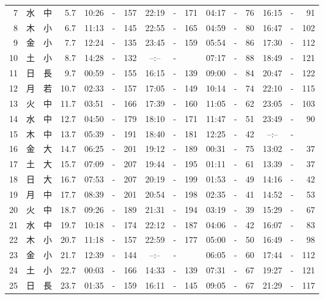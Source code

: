 \documentclass[12pt.a4j]{jsarticle}
\begin{document}
\begin{center}
\begin{table}[ht]
\begin{tabular}{|rc|cr|ccrccr|ccrccr|}
 7 & 水 & 中 &  5.7 &  10:26 &-& 157  &  22:19 &-& 171  &   04:17 &-&  76  &   16:15 &-&  91  \\
 8 & 木 & 小 &  6.7 &  11:13 &-& 145  &  22:55 &-& 165  &   04:59 &-&  80  &   16:47 &-& 102  \\
 9 & 金 & 小 &  7.7 &  12:24 &-& 135  &  23:45 &-& 159  &   05:54 &-&  86  &   17:30 &-& 112  \\
10 & 土 & 小 &  8.7 &  14:28 &-& 132  &  --:-- &-&     &   07:17 &-&  88  &   18:49 &-& 121  \\
11 & 日 & 長 &  9.7 &  00:59 &-& 155  &  16:15 &-& 139  &   09:00 &-&  84  &   20:47 &-& 122  \\
12 & 月 & 若 & 10.7 &  02:33 &-& 157  &  17:05 &-& 149  &   10:14 &-&  74  &   22:10 &-& 115  \\
13 & 火 & 中 & 11.7 &  03:51 &-& 166  &  17:39 &-& 160  &   11:05 &-&  62  &   23:05 &-& 103  \\
14 & 水 & 中 & 12.7 &  04:50 &-& 179  &  18:10 &-& 171  &   11:47 &-&  51  &   23:49 &-&  90  \\
15 & 木 & 中 & 13.7 &  05:39 &-& 191  &  18:40 &-& 181  &   12:25 &-&  42  &   --:-- &-&     \\
16 & 金 & 大 & 14.7 &  06:25 &-& 201  &  19:12 &-& 189  &   00:31 &-&  75  &   13:02 &-&  37  \\
17 & 土 & 大 & 15.7 &  07:09 &-& 207  &  19:44 &-& 195  &   01:11 &-&  61  &   13:39 &-&  37  \\
18 & 日 & 大 & 16.7 &  07:53 &-& 207  &  20:19 &-& 199  &   01:53 &-&  49  &   14:16 &-&  42  \\
19 & 月 & 中 & 17.7 &  08:39 &-& 201  &  20:54 &-& 198  &   02:35 &-&  41  &   14:52 &-&  53  \\
20 & 火 & 中 & 18.7 &  09:26 &-& 189  &  21:31 &-& 194  &   03:19 &-&  39  &   15:29 &-&  67  \\
21 & 水 & 中 & 19.7 &  10:18 &-& 174  &  22:12 &-& 187  &   04:06 &-&  42  &   16:07 &-&  83  \\
22 & 木 & 小 & 20.7 &  11:18 &-& 157  &  22:59 &-& 177  &   05:00 &-&  50  &   16:49 &-&  98  \\
23 & 金 & 小 & 21.7 &  12:39 &-& 144  &  --:-- &-&     &   06:05 &-&  60  &   17:44 &-& 112  \\
24 & 土 & 小 & 22.7 &  00:03 &-& 166  &  14:33 &-& 139  &   07:31 &-&  67  &   19:27 &-& 121  \\
25 & 日 & 長 & 23.7 &  01:35 &-& 159  &  16:11 &-& 145  &   09:05 &-&  67  &   21:29 &-& 117  \\

\end{tabular}
\end{table}
\end{center}
\end{document}

